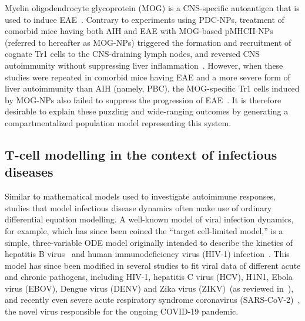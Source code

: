 Myelin oligodendrocyte glycoprotein (MOG) is a CNS-specific autoantigen that is used to induce EAE~\cite{mendel1995myelin}. Contrary to experiments using PDC-NPs, treatment of comorbid mice having both AIH and EAE with MOG-based pMHCII-NPs (referred to hereafter as MOG-NPs) triggered the formation and recruitment of cognate Tr1 cells to the CNS-draining lymph nodes, and reversed CNS autoimmunity without suppressing liver inflammation~\cite{umeshappa2020ubiquitous}. However, when these studies were repeated in comorbid mice having EAE and a more severe form of liver autoimmunity than AIH (namely, PBC), the MOG-specific Tr1 cells induced by MOG-NPs also failed to suppress the progression of EAE~\cite{umeshappa2020ubiquitous}. It is therefore desirable to explain these puzzling and wide-ranging outcomes by generating a compartmentalized population model representing this system.


\subsection*{T-cell modelling in the context of infectious diseases}

Similar to mathematical models used to investigate autoimmune responses, studies that model infectious disease dynamics often make use of ordinary differential equation modelling. A well-known model of viral infection dynamics, for example, which has since been coined the ``target cell-limited model,'' is a simple, three-variable ODE model originally intended to describe the kinetics of hepatitis B virus~\cite{nowak1996viral} and human immunodeficiency virus (HIV-1) infection~\cite{nowak1996population}. This
model has since been modified in several studies to fit viral data of different acute and chronic pathogens, including HIV-1, hepatitis C virus (HCV), H1N1, Ebola virus (EBOV), Dengue virus (DENV) and Zika virus (ZIKV)~(as reviewed in~\cite{zitzmann2018mathematical}), and recently even severe acute respiratory syndrome coronavirus (SARS-CoV-2)~\cite{wang2020modeling}, the novel virus responsible for the ongoing COVID-19 pandemic.

